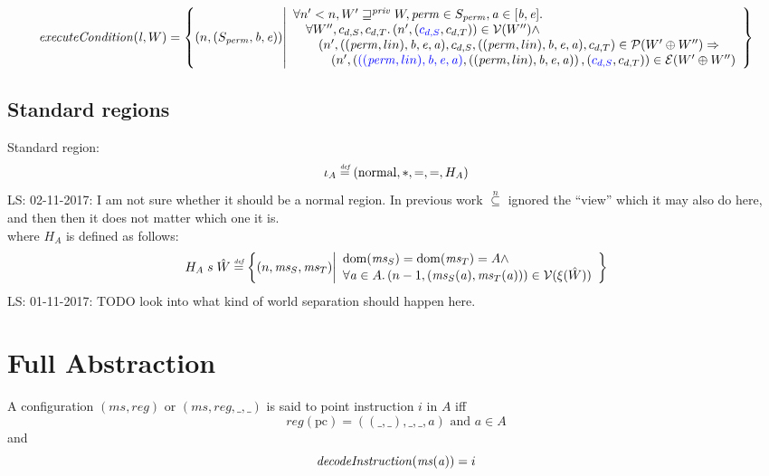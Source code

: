 \documentclass[a3paper]{article}
\newcommand\lau[1]{{\color{purple} \sf \footnotesize {LS: #1}}\\}
\newcommand{\defeq}{\stackrel{\textit{\tiny{def}}}{=}}
\newcommand{\dom}{\mathrm{dom}}
\newcommand{\npair}[2][n]{\left(#1,#2\right)}
\newcommand{\nsubeq}[1][n]{\overset{#1}{\subseteq}}
\newcommand{\tand}{\text{ and }}
\newcommand{\typesetlr}[1]{\mathcal{#1}}
\newcommand{\lre}{\typesetlr{E}}
\newcommand{\lrv}{\typesetlr{V}}
\newcommand{\lrp}{\typesetlr{P}}
\newcommand{\stpair}[3][]{
\ifthenelse{\equal{#1}{}}
{\left(\src{#2_S},#3_T\right)}
{\left(\src{#2},#3\right)}}
\newcommand{\future}{\sqsupseteq}
\newcommand{\privft}{\future^{\priv}}
\newcommand{\sourcecolor}{\color{blue}}
\newcommand{\src}[1]{{\sourcecolor #1}}
\newcommand{\perm}{\var{perm}}
\newcommand{\lin}{\var{l}}
\newcommand{\var}[1]{\mathit{#1}}
\newcommand{\reg}{\var{reg}}
\newcommand{\ms}{\var{ms}}
\newcommand{\priv}{\var{priv}}
\newcommand{\baddr}{\var{b}}
\newcommand{\eaddr}{\var{e}}
\newcommand{\aaddr}{\var{a}}
\newcommand{\pcreg}{\mathrm{pc}}
\newcommand{\plainlinearity}[1]{\mathrm{#1}}
\newcommand{\normal}{\plainlinearity{normal}}
\newcommand{\plainfun}[2]{
  \ifthenelse{\equal{#2}{}}
  {\mathit{#1}}
  {\mathit{#1}(#2)}
}
\newcommand{\decInstr}[1]{\plainfun{decodeInstruction}{#1}}
\newcommand{\execCond}[1]{\plainfun{executeCondition}{#1}}
\begin{document}
\[
  \execCond{\lin,W} = \left\{ \npair{(S_\perm,\baddr,\eaddr)} \middle|
    \begin{array}{l}
      \forall n' < n, W' \privft W, \perm \in S_\perm, \aaddr \in [\baddr,\eaddr] \ldotp\\
      \quad \forall W'', c_{d,S},c_{d,T} \ldotp \npair[n']{\stpair[.]{c_{d,S}}{c_{d,T}}} \in \lrv(W'') \wedge \\
      \qquad \npair[n']{((\perm,lin),\baddr,\eaddr,\aaddr),c_{d,S},((\perm,lin),\baddr,\eaddr,\aaddr),c_{d,T}} \in \lrp(W' \oplus W'') \Rightarrow \\
      \quad \qquad \npair[n']{\stpair[.]{((\perm,lin),\baddr,\eaddr,\aaddr)}{((\perm,lin),\baddr,\eaddr,\aaddr)},\stpair[.]{c_{d,S}}{c_{d,T}}} \in \lre(W' \oplus W'')
    \end{array}
    \right\}
\]


\subsection{Standard regions}
\label{sec:standard-regions}
Standard region:
\[
  \iota_A \defeq (\normal,*,=,=,H_A)
\]
\lau{02-11-2017: I am not sure whether it should be a $\normal$ region. In previous work $\nsubeq$ ignored the ``view'' which it may also do here, and then then it does not matter which one it is.}
where $H_A$ is defined as follows:
\[
  H_A \; s \; \hat{W} \defeq \left\{ \npair{\ms_S,\ms_T} \middle|
    \begin{array}{l}
      \dom(\ms_S) = \dom(\ms_T) = A \wedge \\
      \forall \aaddr \in A \ldotp \npair[n-1]{(\ms_S(\aaddr),\ms_T(\aaddr))} \in \lrv(\xi(\hat{W}))
    \end{array}
  \right\}
\]
\lau{01-11-2017: TODO look into what kind of world separation should happen here.}

\section{Full Abstraction}
\begin{definition}
  \label{def:points-to-instr}
  A configuration $(\ms,\reg)$ {\sourcecolor or $(\ms,\reg,\_,\_)$} is said to point instruction $i$ in $A$ iff
  \[
    \reg(\pcreg) = ((\_,\_),\_,\_,\aaddr) \tand \aaddr \in A
  \]
and
\[
  \decInstr{\ms(\aaddr)} = i
\]
\end{definition}
\end{document}
